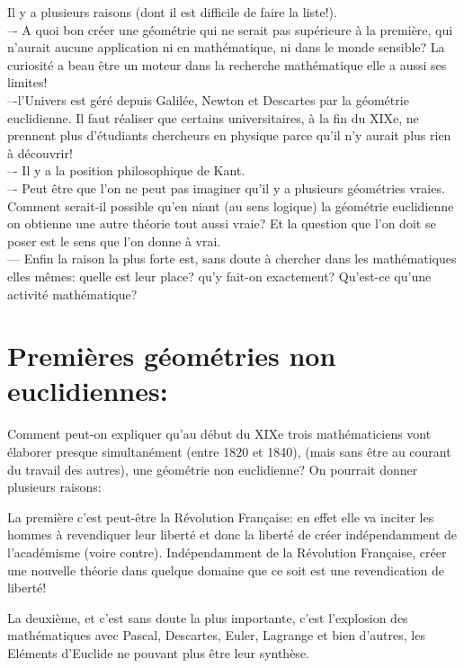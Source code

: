 \documentclass[a4paper, 12pt, twoside]{book}
\begin{document}
  Il y a plusieurs raisons (dont il est difficile de faire la liste!).\\
  
–- A quoi bon créer une géométrie qui ne serait pas supérieure à la première, qui n’aurait aucune application ni en mathématique, ni dans le monde sensible? La curiosité a beau être un moteur dans la recherche mathématique elle a aussi ses limites!\\

–-l’Univers est géré depuis Galilée, Newton et Descartes par la géométrie euclidienne. Il  faut réaliser que certains universitaires, à la fin du XIXe, ne prennent plus d'étudiants chercheurs en physique parce qu'il n'y aurait plus rien à découvrir!\\

–- Il y a la position philosophique de Kant.\\

–-  Peut être que l'on ne peut pas imaginer qu'il y a plusieurs géométries vraies. Comment serait-il possible qu'en niant (au sens 
logique) la géométrie euclidienne on obtienne une autre théorie tout aussi vraie? Et la question que l'on doit se poser est le sens que l'on donne à vrai.\\

--- Enfin la raison la plus forte est, sans doute à chercher dans les mathématiques elles mêmes: quelle est leur place? qu'y fait-on exactement? Qu'est-ce qu'une activité mathématique?\\

\section{Premières géométries non euclidiennes: }

Comment peut-on expliquer qu'au début du XIXe trois mathématiciens vont élaborer presque simultanément (entre 1820 et 1840), (mais sans être au courant du travail des autres), une géométrie non euclidienne?
 On pourrait donner plusieurs raisons:\
 
 
 
  La première c'est peut-être la Révolution Française: en effet elle va inciter les hommes à revendiquer leur liberté et donc la liberté de créer indépendamment  de l'académisme (voire contre). Indépendamment de la Révolution Française, créer une nouvelle théorie dans quelque domaine que ce soit est une revendication de liberté!\
  
  
 La deuxième, et c'est sans doute la plus importante, c'est l'explosion des mathématiques avec Pascal, Descartes, Euler, Lagrange et bien d'autres, les Eléments d'Euclide ne pouvant plus être leur synthèse.\
 
\end{document}
